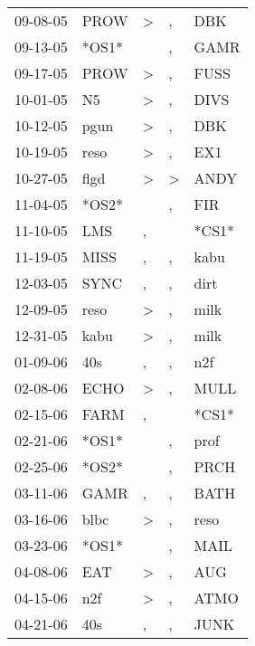 \begin{supertabular}{lllll}
 09-08-05 &   PROW &     \textgreater &                , &    DBK \\
 09-13-05 &  *OS1* &                  &                , &   GAMR \\
 09-17-05 &   PROW &     \textgreater &                , &   FUSS \\
 10-01-05 &     N5 &     \textgreater &                , &   DIVS \\
 10-12-05 &   pgun &     \textgreater &                , &    DBK \\
 10-19-05 &   reso &     \textgreater &                , &    EX1 \\
 10-27-05 &   flgd &     \textgreater &     \textgreater &   ANDY \\
 11-04-05 &  *OS2* &                  &                , &    FIR \\
 11-10-05 &    LMS &                , &                  &  *CS1* \\
 11-19-05 &   MISS &                , &                , &   kabu \\
 12-03-05 &   SYNC &                , &                , &   dirt \\
 12-09-05 &   reso &     \textgreater &                , &   milk \\
 12-31-05 &   kabu &     \textgreater &                , &   milk \\
 01-09-06 &    40s &                , &                , &    n2f \\
 02-08-06 &   ECHO &     \textgreater &                , &   MULL \\
 02-15-06 &   FARM &                , &                  &  *CS1* \\
 02-21-06 &  *OS1* &                  &                , &   prof \\
 02-25-06 &  *OS2* &                  &                , &   PRCH \\
 03-11-06 &   GAMR &                , &                , &   BATH \\
 03-16-06 &   blbc &     \textgreater &                , &   reso \\
 03-23-06 &  *OS1* &                  &                , &   MAIL \\
 04-08-06 &    EAT &     \textgreater &                , &    AUG \\
 04-15-06 &    n2f &     \textgreater &                , &   ATMO \\
 04-21-06 &    40s &                , &                , &   JUNK \\

\end{supertabular}
